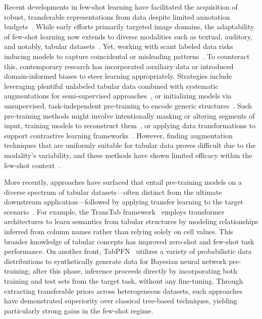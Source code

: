 Recent developments in few-shot learning have facilitated the acquisition of robust, transferable representations from data despite limited annotation budgets~\cite{chen2018closer}. While early efforts primarily targeted image domains, the adaptability of few-shot learning now extends to diverse modalities such as textual, auditory, and notably, tabular datasets~\cite{majumder2022few,nam2023stunt,schick2021exploiting}. Yet, working with scant labeled data risks inducing models to capture coincidental or misleading patterns~\cite{bartlett2021deep}. To counteract this, contemporary research has incorporated auxiliary data or introduced domain-informed biases to steer learning appropriately. Strategies include leveraging plentiful unlabeled tabular data combined with systematic augmentations for semi-supervised approaches~\cite{ucar2021subtab,yoon2020vime}, or initializing models via unsupervised, task-independent pre-training to encode generic structures~\cite{somepalli2021saint}. Such pre-training methods might involve intentionally masking or altering segments of input, training models to reconstruct them~\cite{arik2021tabnet,majmundar2022met}, or applying data transformations to support contrastive learning frameworks~\cite{bahri2022scarf,chen2020simple}. However, finding augmentation techniques that are uniformly suitable for tabular data proves difficult due to the modality’s variability, and these methods have shown limited efficacy within the few-shot context~\cite{nam2023stunt}.

More recently, approaches have surfaced that entail pre-training models on a diverse spectrum of tabular datasets—often distinct from the ultimate downstream application—followed by applying transfer learning to the target scenario~\cite{zhang2023generative,levin2022transfer,zhu2023xtab}. For example, the TransTab framework~\cite{wang2022transtab} employs transformer architectures to learn semantics from tabular structures by modeling relationships inferred from column names rather than relying solely on cell values. This broader knowledge of tabular concepts has improved zero-shot and few-shot task performance. On another front, TabPFN~\cite{hollmann2022tabpfn} utilizes a variety of probabilistic data distributions to synthetically generate data for Bayesian neural network pre-training; after this phase, inference proceeds directly by incorporating both training and test sets from the target task, without any fine-tuning. Through extracting transferable priors across heterogeneous datasets, such approaches have demonstrated superiority over classical tree-based techniques, yielding particularly strong gains in the few-shot regime.

